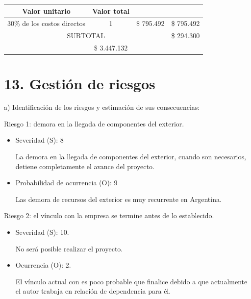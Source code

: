 \documentclass[
11pt, %
codirector, %
]{charter}
\begin{document}
\begin{table}[htpb]
\begin{tabularx}{\linewidth}{@{}|X|c|r|r|@{}}
		\multicolumn{1}{c|}{\cellcolor[HTML]{C0C0C0}Valor unitario} &
		\multicolumn{1}{c|}{\cellcolor[HTML]{C0C0C0}Valor total}        \\ \hline
		\multicolumn{1}{|l|}{30\% de los costos directos}           &
		\multicolumn{1}{c|}{1}                                      &
		\multicolumn{1}{c|}{\$ 795.492}                             &
		\multicolumn{1}{c|}{\$ 795.492}                                 \\ \hline
		\multicolumn{3}{|c|}{SUBTOTAL}                              &
		\multicolumn{1}{c|}{\$ 294.300}                                 \\ \hline
		\rowcolor[HTML]{C0C0C0}
		\multicolumn{3}{|c|}{TOTAL}                                 &
		\multicolumn{1}{c|}{\$ 3.447.132}                               \\ \hline
	\end{tabularx}%
\end{table}


\section{13. Gestión de riesgos}
\label{sec:riesgos}

a) Identificación de los riesgos y estimación de sus consecuencias:

Riesgo 1: demora en la llegada de componentes del exterior.
\begin{itemize}
	\item Severidad (S): 8

	      La demora en la llegada de componentes del exterior, cuando son necesarios, detiene completamente el avance del proyecto.
	\item Probabilidad de ocurrencia (O): 9

	      Las demora de recursos del exterior es muy recurrente en Argentina.
\end{itemize}

Riesgo 2: el vínculo con la empresa se termine antes de lo establecido.
\begin{itemize}
	\item Severidad (S): 10.

	      No será posible realizar el proyecto.
	\item Ocurrencia (O): 2.

	      El vínculo actual con \clientename\hspace{1px}  es poco probable que finalice debido a que actualmente el autor trabaja en relación de dependencia para él.
\end{itemize}
\end{document}
